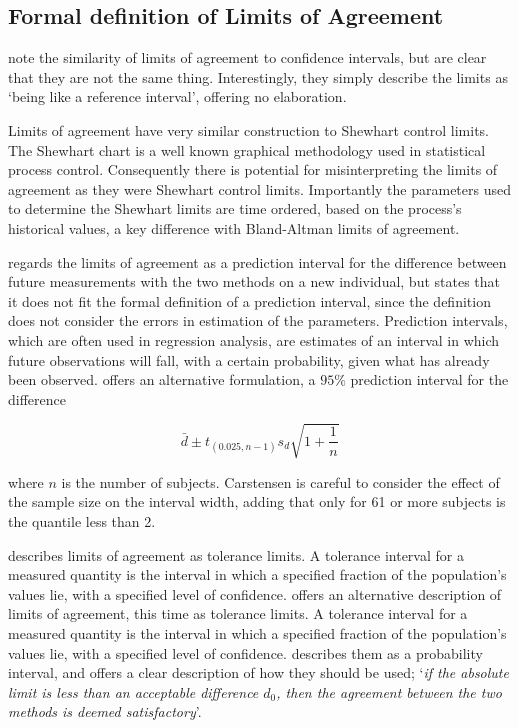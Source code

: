 \documentclass[12pt, a4paper]{report}
\theoremstyle{plain}
\theoremstyle{definition}
\theoremstyle{remark}
\begin{document}
\subsection{Formal definition of Limits of Agreement}
\citet{BA99} note the similarity of limits of agreement to confidence intervals, but are clear that they are not the same
thing. Interestingly, they simply describe the limits as `being like a reference interval', offering no elaboration.

Limits of agreement have very similar construction to Shewhart control limits. The Shewhart chart is a well known graphical
methodology used in statistical process control. Consequently there is potential for misinterpreting the limits of agreement as
they were Shewhart control limits. Importantly the parameters used to determine the Shewhart limits are time ordered, based on the process's historical values, a key difference with Bland-Altman limits of agreement.

\citet{BXC2008} regards the limits of agreement as a prediction interval for the difference between future measurements with the
two methods on a new individual, but states that it does not fit the formal definition of a prediction interval, since the definition does not consider the errors in estimation of the parameters. Prediction intervals, which are often used in regression analysis, are estimates of an interval in which future observations will fall, with a certain probability, given what has
already been observed. \citet{BXC2008} offers an alternative formulation, a $95\%$ prediction interval for the difference

\[
\bar{d} \pm t_{(0.025, n-1)}s_{d} \sqrt{1+\frac{1}{n}}
\]

\noindent where $n$ is the number of subjects. Carstensen is careful to consider the effect of the sample size on the interval
width, adding that only for 61 or more subjects is the quantile less than 2.

\citet{luiz} describes limits of agreement as tolerance limits. A
tolerance interval for a measured quantity is the interval in
which a specified fraction of the population's values lie, with a
specified level of confidence. \citet{luiz} offers an alternative description of limits of agreement, this time as tolerance limits. A tolerance interval for a measured quantity is the interval in which a specified fraction of the population's values lie, with a specified level of confidence. \citet{Barnhart} describes them as a probability interval, and offers a clear description of how they should be used; `\textit{if the absolute limit is less than an acceptable difference $d_{0}$, then the agreement between the two methods is deemed satisfactory}'.
\end{document}
